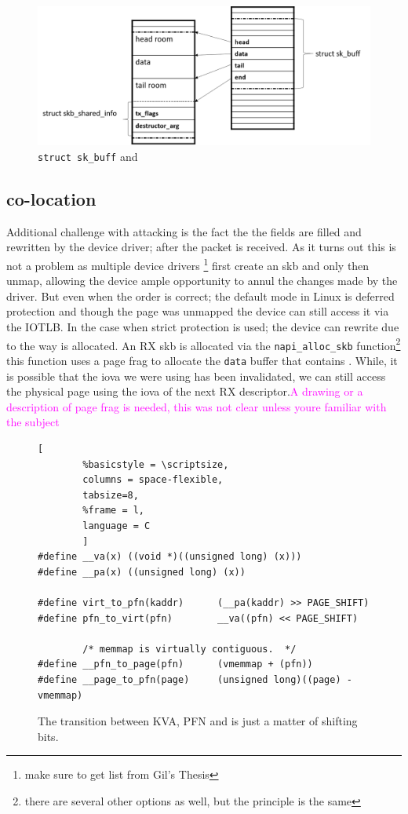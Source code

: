 \begin{figure}
    \centering
    \includegraphics[width=1.2\linewidth]{figs/skb.png}
    \caption{\texttt{struct sk\_buff} and \shinfo}
    \label{fig:sh_info}
\end{figure}

\subsection{\shinfo co-location}
Additional challenge with attacking \shinfo is the fact the the fields are filled and rewritten by the device driver; after the packet is received. As it turns out this is not a problem as multiple device drivers \footnote{make sure to get list from Gil's Thesis} first create an skb and only then unmap, allowing the device ample opportunity to annul the changes made by the driver. But even when the order is correct; the default mode in Linux is deferred protection and though the page was unmapped the device can still access it via the IOTLB. In the case when strict protection is used; the device can rewrite \shinfo due to the way \shinfo is allocated. An RX skb is allocated via the \texttt{napi\_alloc\_skb} function\footnote{there are several other options as well, but the principle is the same} this function uses a page frag to allocate the \texttt{data} buffer that contains \shinfo. While, it is possible that the iova we were using has been invalidated, we can still access the physical page using the iova of the next RX descriptor.\textcolor{magenta}{A drawing or a description of page frag is needed, this was not clear unless youre familiar with the subject}
\begin{figure}[t]
                \begin{lstlisting}[
        %basicstyle = \scriptsize,
        columns = space-flexible,
        tabsize=8,
        %frame = l,
        language = C
        ]
#define __va(x) ((void *)((unsigned long) (x)))
#define __pa(x) ((unsigned long) (x))

#define virt_to_pfn(kaddr)      (__pa(kaddr) >> PAGE_SHIFT)
#define pfn_to_virt(pfn)        __va((pfn) << PAGE_SHIFT)

        /* memmap is virtually contiguous.  */
#define __pfn_to_page(pfn)      (vmemmap + (pfn))  
#define __page_to_pfn(page)     (unsigned long)((page) - vmemmap)
                \end{lstlisting}
        \caption{ The transition between KVA, PFN and \page is just a matter of shifting bits.
                }
        \label{fig:mem_model}
\end{figure}

